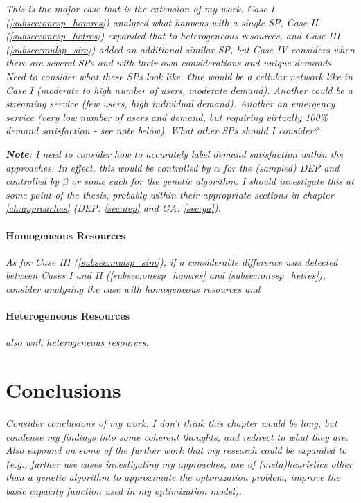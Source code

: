 \documentclass[12pt,dvipsnames]{report}
\begin{document}
\textit{This is the major case that is the extension of my work.  Case I (\ref{subsec:onesp_homres}) analyzed what happens with a single SP, Case II (\ref{subsec:onesp_hetres}) expanded that to heterogeneous resources, and Case III (\ref{subsec:mulsp_sim}) added an additional similar SP, but Case IV considers when there are several SPs and with their own considerations and unique demands.  Need to consider what these SPs look like.  One would be a cellular network like in Case I (moderate to high number of users, moderate demand).  Another could be a streaming service (few users, high individual demand).  Another an emergency service (very low number of users and demand, but requiring virtually 100\% demand satisfaction - see note below).  What other SPs should I consider?}

\textit{\textbf{Note}: I need to consider how to accurately label demand satisfaction within the approaches.  In effect, this would be controlled by $\alpha$ for the (sampled) DEP and controlled by $\beta$ or some such for the genetic algorithm.  I should investigate this at some point of the thesis, probably within their appropriate sections in chapter \ref{ch:approaches} (DEP: \ref{sec:dep} and GA: \ref{sec:ga}).}

\subsubsection{Homogeneous Resources} \label{subsubsec:mulsp_spec_homres}

\textit{As for Case III (\ref{subsec:mulsp_sim}), if a considerable difference was detected between Cases I and II (\ref{subsec:onesp_homres} and \ref{subsec:onesp_hetres}), consider analyzing the case with homogeneous resources and}

\subsubsection{Heterogeneous Resources} \label{subsubsec:mulsp_spec_hetres}

\textit{also with heterogeneous resources.}
\fi

\iftrue
\pagebreak
\chapter{Conclusions} \label{ch:conc}

%
\textit{Consider conclusions of my work.  I don't think this chapter would be long, but condense my findings into some coherent thoughts, and redirect to what they are.  Also expound on some of the further work that my research could be expanded to (e.g., further use cases investigating my approaches, use of (meta)heuristics other than a genetic algorithm to approximate the optimization problem, improve the basic capacity function used in my optimization model).}
\end{document}
